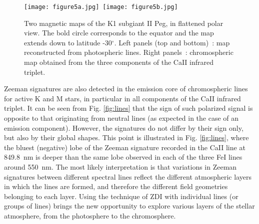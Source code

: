 \documentclass[11pt,twoside]{article}
\begin{document}
\begin{figure}[t]
  \centering
   \mbox{\texttt{[image: figure5a.jpg]} \hspace{20 mm} \texttt{[image: figure5b.jpg]}}
   \caption{Two magnetic maps of the K1 subgiant II Peg, in flattened polar view. The bold circle corresponds to the equator and the map extends down to latitude -30$^\circ$. Left panels (top and bottom)~: map reconstructed from photospheric lines. Right panels~: chromospheric map obtained from the three components of the CaII infrared triplet.}
   \label{fig:chromosphere}
\end{figure}

Zeeman signatures are also detected in the emission core of chromospheric lines for active K and M stars, in particular in all components of the CaII infrared triplet. It can be seen from Fig. \ref{fig:lines} that the sign of such polarized signal is opposite to that originating from neutral lines (as expected in the case of an emission component). However, the signatures  do not differ by their sign only, but also by their global shapes. This point is illustrated in Fig. \ref{fig:lines}, where the bluest (negative) lobe of the Zeeman signature recorded in the CaII line at 849.8~nm is deeper than the same lobe observed in each of the three FeI lines around 550~nm. The most likely interpretation is that variations in Zeeman signatures between different spectral lines reflect the different atmospheric layers in which the lines are formed, and therefore the different field geometries belonging to each layer. Using the technique of ZDI with individual lines (or groups of lines) brings the new opportunity to explore various layers of the stellar atmosphere, from the photosphere to the chromosphere. 
\end{document}
